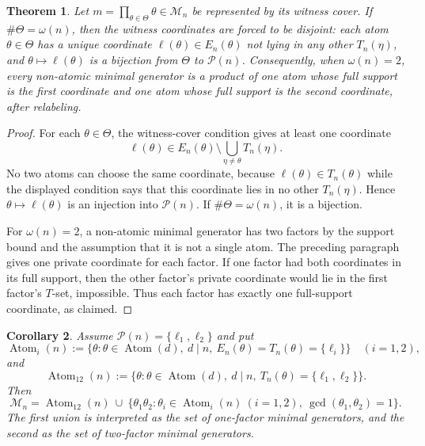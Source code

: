 \documentclass[11pt,letterpaper]{article}
\numberwithin{equation}{section}
\theoremstyle{plain}
\newtheorem{theorem}{Theorem}[section]
\newtheorem{corollary}[theorem]{Corollary}
\theoremstyle{definition}
\theoremstyle{remark}
\DeclareMathOperator{\Atom}{Atom}
\begin{document}
\begin{theorem}\label{thm:extremal-coordinate-separation}
Let $m=\prod_{\theta\in\Theta}\theta\in\mathcal M_n$ be represented by its
witness cover. If $\#\Theta=\omega(n)$, then the witness coordinates are
forced to be disjoint: each atom $\theta\in\Theta$ has a unique coordinate
$\ell(\theta)\in E_n(\theta)$ not lying in any other $T_n(\eta)$, and
$\theta\mapsto\ell(\theta)$ is a bijection from $\Theta$ to $\mathcal P(n)$.
Consequently, when $\omega(n)=2$, every non-atomic minimal generator is a
product of one atom whose full support is the first coordinate and one atom
whose full support is the second coordinate, after relabeling.
\end{theorem}

\begin{proof}
For each $\theta\in\Theta$, the witness-cover condition gives at least one
coordinate
\[
\ell(\theta)\in
E_n(\theta)\setminus\bigcup_{\eta\ne\theta}T_n(\eta).
\]
No two atoms can choose the same coordinate, because
$\ell(\theta)\in T_n(\theta)$ while the displayed condition says that this
coordinate lies in no other $T_n(\eta)$. Hence
$\theta\mapsto\ell(\theta)$ is an injection into $\mathcal P(n)$. If
$\#\Theta=\omega(n)$, it is a bijection.

For $\omega(n)=2$, a non-atomic minimal generator has two factors by the
support bound and the assumption that it is not a single atom. The preceding
paragraph gives one private coordinate for each factor. If one factor had both
coordinates in its full support, then the other factor's private coordinate
would lie in the first factor's $T$-set, impossible. Thus each factor has
exactly one full-support coordinate, as claimed.
\end{proof}

\begin{corollary}\label{cor:two-support-complete-classification}
Assume $\mathcal P(n)=\{\ell_1,\ell_2\}$ and put
\[
\Atom_i(n):=\{\theta:\theta\in\Atom(d),\ d\mid n,\
E_n(\theta)=T_n(\theta)=\{\ell_i\}\}
\quad(i=1,2),
\]
and
\[
\Atom_{12}(n):=\{\theta:\theta\in\Atom(d),\ d\mid n,\ 
T_n(\theta)=\{\ell_1,\ell_2\}\}.
\]
Then
\[
\mathcal M_n=
\Atom_{12}(n)\ \cup\
\{\theta_1\theta_2:\theta_i\in\Atom_i(n)\ (i=1,2),\
\gcd(\theta_1,\theta_2)=1\}.
\]
The first union is interpreted as the set of one-factor minimal generators,
and the second as the set of two-factor minimal generators.
\end{corollary}
\end{document}

